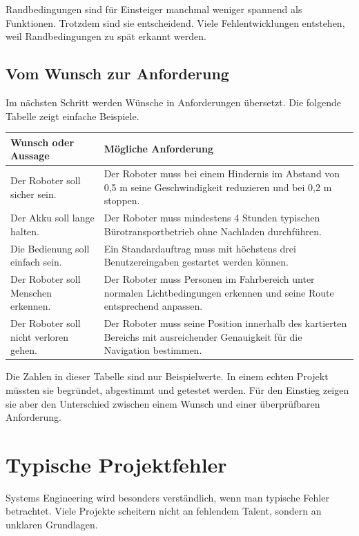Randbedingungen sind für Einsteiger manchmal weniger spannend als Funktionen. Trotzdem sind sie entscheidend. Viele Fehlentwicklungen entstehen, weil Randbedingungen zu spät erkannt werden.

\subsection{Vom Wunsch zur Anforderung}
Im nächsten Schritt werden Wünsche in Anforderungen übersetzt. Die folgende Tabelle zeigt einfache Beispiele.

\begin{center}
\begin{tabular}{p{}p{}}
\toprule
\textbf{Wunsch oder Aussage} & \textbf{Mögliche Anforderung} \\
\midrule
Der Roboter soll sicher sein. & Der Roboter muss bei einem Hindernis im Abstand von 0,5 m seine Geschwindigkeit reduzieren und bei 0,2 m stoppen. \\
Der Akku soll lange halten. & Der Roboter muss mindestens 4 Stunden typischen Bürotransportbetrieb ohne Nachladen durchführen. \\
Die Bedienung soll einfach sein. & Ein Standardauftrag muss mit höchstens drei Benutzereingaben gestartet werden können. \\
Der Roboter soll Menschen erkennen. & Der Roboter muss Personen im Fahrbereich unter normalen Lichtbedingungen erkennen und seine Route entsprechend anpassen. \\
Der Roboter soll nicht verloren gehen. & Der Roboter muss seine Position innerhalb des kartierten Bereichs mit ausreichender Genauigkeit für die Navigation bestimmen. \\
\bottomrule
\end{tabular}
\end{center}

Die Zahlen in dieser Tabelle sind nur Beispielwerte. In einem echten Projekt müssten sie begründet, abgestimmt und getestet werden. Für den Einstieg zeigen sie aber den Unterschied zwischen einem Wunsch und einer überprüfbaren Anforderung.

\section{Typische Projektfehler}
Systems Engineering wird besonders verständlich, wenn man typische Fehler betrachtet. Viele Projekte scheitern nicht an fehlendem Talent, sondern an unklaren Grundlagen.

